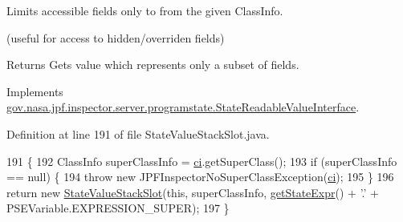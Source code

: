 Limits accessible fields only to from the given Class\+Info. 

(useful for access to hidden/overriden fields)

\begin{DoxyReturn}{Returns}
Gets value which represents only a subset of fields. 
\end{DoxyReturn}


Implements \hyperlink{interfacegov_1_1nasa_1_1jpf_1_1inspector_1_1server_1_1programstate_1_1_state_readable_value_interface_a299f20e9db1151e4fdbe870583743799}{gov.\+nasa.\+jpf.\+inspector.\+server.\+programstate.\+State\+Readable\+Value\+Interface}.



Definition at line 191 of file State\+Value\+Stack\+Slot.\+java.


\begin{DoxyCode}
191                                                                                  \{
192     ClassInfo superClassInfo = \hyperlink{classgov_1_1nasa_1_1jpf_1_1inspector_1_1server_1_1programstate_1_1_state_value_a0eb4aa1e630ed6372dcfb8c41ae7edc5}{ci}.getSuperClass();
193     \textcolor{keywordflow}{if} (superClassInfo == null) \{
194       \textcolor{keywordflow}{throw} \textcolor{keyword}{new} JPFInspectorNoSuperClassException(\hyperlink{classgov_1_1nasa_1_1jpf_1_1inspector_1_1server_1_1programstate_1_1_state_value_a0eb4aa1e630ed6372dcfb8c41ae7edc5}{ci});
195     \}
196     \textcolor{keywordflow}{return} \textcolor{keyword}{new} \hyperlink{classgov_1_1nasa_1_1jpf_1_1inspector_1_1server_1_1programstate_1_1_state_value_stack_slot_a6addc1cee4ec49c656f1fcaa7b8d919d}{StateValueStackSlot}(\textcolor{keyword}{this}, superClassInfo, 
      \hyperlink{classgov_1_1nasa_1_1jpf_1_1inspector_1_1server_1_1programstate_1_1_state_node_a54c1c8d91f93c078171589f844252bdf}{getStateExpr}() + \textcolor{charliteral}{'.'} + PSEVariable.EXPRESSION\_SUPER);
197   \}
\end{DoxyCode}
